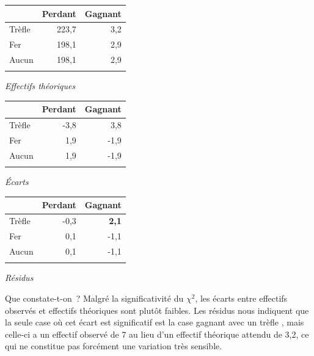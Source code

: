 \documentclass[a4paper,10pt,twoside,francais]{report}
\newcommand{\chid}{$\chi^2$\xspace}
\begin{document}
\begin{center}
  \hfill
  \begin{minipage}[c]{.3\linewidth}
    \footnotesize
    \begin{center}
    \begin{tabular}[!h]{lrr}
      \toprule
      & Perdant & Gagnant \\
      \midrule
      Trèfle & 223,7 & 3,2  \\
      Fer & 198,1 & 2,9  \\
      Aucun & 198,1 & 2,9 \\ 
      \bottomrule\\
    \end{tabular}
    \textit{Effectifs théoriques}
  \end{center}
\end{minipage} 
  \hfill
  \begin{minipage}[c]{.3\linewidth}
    \footnotesize
    \begin{center}
    \begin{tabular}[!h]{lrr}
      \toprule
      & Perdant & Gagnant \\
      \midrule
      Trèfle & -3,8 & 3,8  \\
      Fer & 1,9 & -1,9  \\
      Aucun & 1,9 & -1,9 \\ 
      \bottomrule\\
    \end{tabular}
    \textit{Écarts}
    \end{center}
\end{minipage} 
  \hfill
  \begin{minipage}[c]{.3\linewidth}
    \footnotesize
    \begin{center}
    \begin{tabular}[!h]{lrr}
      \toprule
      & Perdant & Gagnant \\
      \midrule
      Trèfle & -0,3 & \textbf{2,1}  \\
      Fer & 0,1 & -1,1  \\
      Aucun & 0,1 & -1,1 \\ 
      \bottomrule\\
    \end{tabular}
    \textit{Résidus}
  \end{center}
\end{minipage} 
  \hfill
\end{center}

Que constate-t-on~? Malgré la significativité du \chid, les écarts
entre effectifs observés et effectifs théoriques sont plutôt
faibles. Les résidus nous indiquent que la seule case où cet écart est
significatif est la case \og gagnant avec un trèfle \fg{}, mais celle-ci a un
effectif observé de 7 au lieu d'un effectif théorique attendu de 3,2,
ce qui ne constitue pas forcément une variation très sensible.
\end{document}
